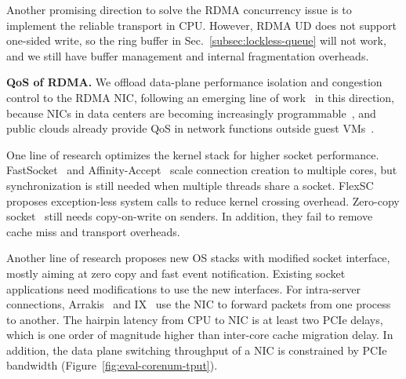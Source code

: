 Another promising direction to solve the RDMA concurrency issue is to implement the reliable transport in CPU. However, RDMA UD does not support one-sided write, so the ring buffer in Sec.~\ref{subsec:lockless-queue} will not work, and we still have buffer management and internal fragmentation overheads.

\textbf{QoS of RDMA.}
We offload data-plane performance isolation and congestion control to the RDMA NIC, following an emerging line of work~\cite{peter2016arrakis,zhu2015congestion,lu2017memory,mprdma,mittal2018revisiting} in this direction, because NICs in data centers are becoming increasingly programmable~\cite{cavium,kaufmann2015flexnic,mellanox-innova,mellanox-bluefield}, and public clouds already provide QoS in network functions outside guest VMs~\cite{smartnic,li2016clicknp}.




\iffalse
{}
One line of research optimizes the kernel stack for higher socket performance. FastSocket~\cite{lin2016scalable} and Affinity-Accept~\cite{pesterev2012improving} scale connection creation to multiple cores, but synchronization is still needed when multiple threads share a socket.
FlexSC~\cite{soares2010flexsc} proposes exception-less system calls to reduce kernel crossing overhead.
Zero-copy socket~\cite{thadani1995efficient,chu1996zero} still needs copy-on-write on senders.
In addition, they fail to remove cache miss and transport overheads.


Another line of research proposes new OS stacks with modified socket interface, mostly aiming at zero copy and fast event notification. Existing socket applications need modifications to use the new interfaces.
For intra-server connections, Arrakis~\cite{peter2016arrakis} and IX~\cite{belay2017ix} use the NIC to forward packets from one process to another. The hairpin latency from CPU to NIC is at least two PCIe delays, which is one order of magnitude higher than inter-core cache migration delay. In addition, the data plane switching throughput of a NIC is constrained by PCIe bandwidth (Figure~\ref{fig:eval-corenum-tput}).

